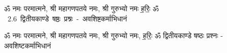 \documentclass[17pt]{extarticle}
\begin{document}
\begin{titlepage}
    \begin{center}
 
\begin{sanskrit}
    { \Large
    ॐ नमः परमात्मने, श्री महागणपतये नमः, श्री गुरुभ्यो नमः
ह॒रिः॒ ॐ 
    }
    \\
    \vspace{2.5cm}
    \mbox{ \Huge
    2.6      द्वितीयकाण्डे षष्ठः प्रश्नः - अवशिष्टकर्माभिधानं   }
\end{sanskrit}
\end{center}

\end{titlepage}
\tableofcontents

ॐ नमः परमात्मने, श्री महागणपतये नमः, 
श्री गुरुभ्यो नमः, ह॒रिः॒ ॐ       द्वितीयकाण्डे षष्ठः प्रश्नः - अवशिष्टकर्माभिधानं \newline

\end{document}
